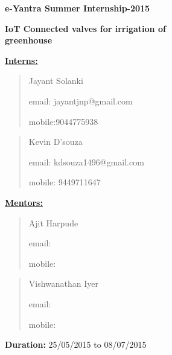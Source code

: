 \documentclass[16pt]{article}
\begin{document}
\begin{titlepage}
 
       

       \hfill\hfill\hfill
\begin{figure}
\end{figure}
       {\LARGE{\textbf{e-Yantra Summer Internship-2015 \\ }}}
       
       \vspace{0.5cm}
       {\Large{\textbf{IoT Connected valves for irrigation of}}} \\  
      
       
        {\Large{\textbf{\hspace{3.2cm} greenhouse}}}
        
         \vspace{0.5cm}
        {\underline{\textbf{Interns:}}} \\
        \begin{quote}
        	Jayant Solanki
        	
        	email: jayantjnp@gmail.com		
        	
        	mobile:9044775938
        \end{quote}
        
        
		
		\begin{quote}
			Kevin D'souza
			
			email: kdsouza1496@gmail.com
			
			mobile: 9449711647
		\end{quote}
        
        
        \vspace{1cm}
        
          {\underline{\textbf{Mentors:}}} \\
          \begin{quote}
          Ajit Harpude 
          
          email: 
        
          mobile: \\
        \end{quote}
          \begin{quote}
          Vishwanathan Iyer
          
          email: 
        
          mobile:  \\
          \end{quote}
          \textbf{Duration:} 25/05/2015 to 08/07/2015
          
\end{titlepage}
\tableofcontents
\vspace{15cm }
\end{document}

